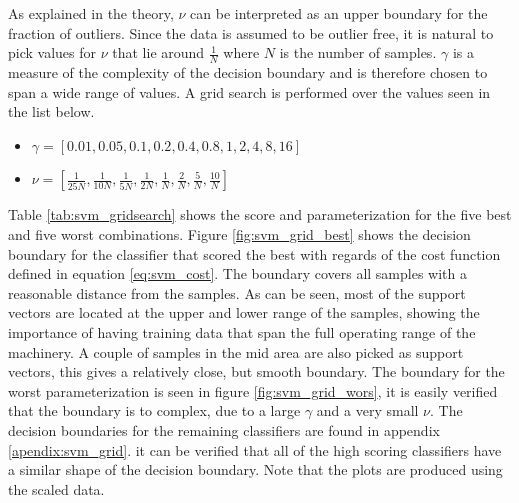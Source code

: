                As explained in the theory, $\nu$ can be interpreted as an upper boundary for the fraction of outliers. Since the data is assumed to be outlier free, it is natural to pick values for $\nu$ that lie around $\frac{1}{N}$ where $N$ is the number of samples. $\gamma$ is a measure of the complexity of the decision boundary and is therefore chosen to span a wide range of values. A grid search is performed over the values seen in the list below. 
                \begin{itemize}
                    \item $\gamma =  [0.01,0.05,0.1,0.2,0.4,0.8,1,2,4,8,16]$
                    \item $\nu = [\frac{1}{25N}, \frac{1}{10N},\frac{1}{5N},\frac{1}{2N},\frac{1}{N},\frac{2}{N},\frac{5}{N},\frac{10}{N}]$
                    \label{list:svm_grid}
                \end{itemize}
                Table \ref{tab:svm_gridsearch} shows the score and parameterization for the five best and five worst combinations. Figure \ref{fig:svm_grid_best} shows the decision boundary for the classifier that scored the best with regards of the cost function defined in equation \ref{eq:svm_cost}. The boundary covers all samples with a reasonable distance from the samples. As can be seen, most of the support vectors are located at the upper and lower range of the samples, showing the importance of having training data that span the full operating range of the machinery. A couple of samples in the mid area are also picked as support vectors, this gives a relatively close, but smooth boundary. The boundary for the worst parameterization is seen in figure \ref{fig:svm_grid_wors}, it is easily verified that the boundary is to complex, due to a large $\gamma$ and a very small $\nu$. The decision boundaries for the remaining classifiers are found in appendix \ref{apendix:svm_grid}. it can be verified that all of the high scoring classifiers have a similar shape of the decision boundary. Note that the plots are produced using the scaled data. 
                
                
                
